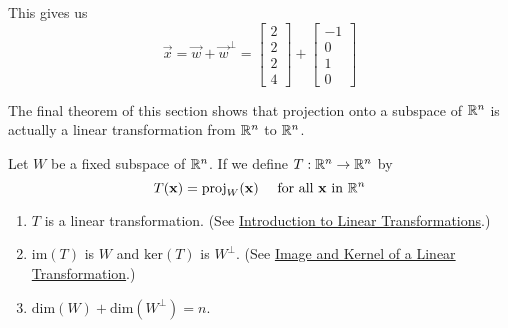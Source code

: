 \documentclass{ximera}
\begin{document}
\begin{example}
\begin{explanation}
  This gives us
  $$\vec{x}=\vec{w}+\vec{w}^\perp=\begin{bmatrix}2\\2\\2\\4\end{bmatrix}+\begin{bmatrix}-1\\0\\1\\0\end{bmatrix}$$
  \end{explanation}
  \end{example}
  
The final theorem of this section shows that projection onto a subspace of $\mathbb{R}^n$ is actually a linear transformation from $\mathbb{R}^n$ to $\mathbb{R}^n$.

\begin{theorem}\label{th:ProjLinTran}
Let $W$ be a fixed subspace of $\mathbb{R}^n$. If we define $T : \mathbb{R}^n \to \mathbb{R}^n$ by
\begin{equation*}
T(\mathbf{x}) = \mbox{proj}_W(\mathbf{x}) \quad \mbox{ for all }\mathbf{x}\mbox{ in }\mathbb{R}^n
\end{equation*}
\begin{enumerate}
\item\label{th:ProjLinTran_a} $T$ is a linear transformation.  (See \href{https://ximera.osu.edu/oerlinalg/LinearAlgebra/LTR-0010/main}{Introduction to Linear Transformations}.)

\item\label{th:ProjLinTran_b} $\mbox{im}(T)$ is $W$ and $\mbox{ker}(T)$ is $ W^\perp$.  (See \href{https://ximera.osu.edu/oerlinalg/LinearAlgebra/LTR-0050/main}{Image and Kernel of a Linear Transformation}.)

\item\label{th:ProjLinTran_c} $\mbox{dim}(W) + \mbox{dim}(W^\perp) = n$.

\end{enumerate}
\end{theorem}
\end{document}
